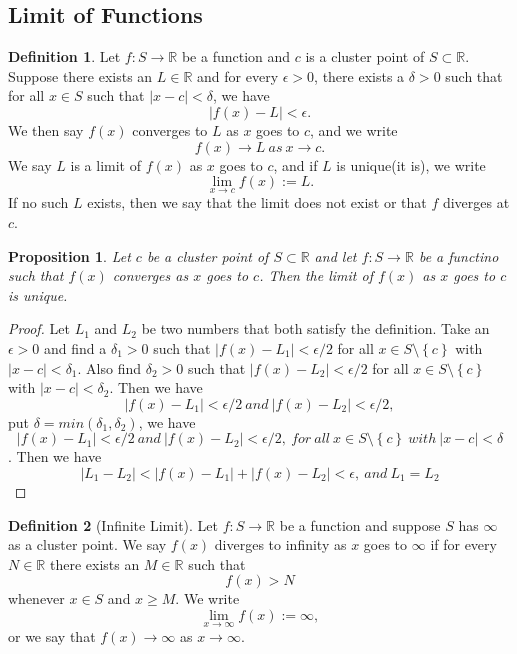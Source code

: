 \documentclass{article}
\newtheorem{prop}[theorem]{Proposition}
\theoremstyle{definition}
\newtheorem{defi}{Definition}[section]
\begin{document}
\subsection{Limit of Functions}
\begin{defi}
Let $f:S\rightarrow \mathbb{R}$ be a function and $c$ is a cluster point of $S\subset \mathbb{R}$. Suppose there exists an $L\in\mathbb{R}$ and for 
every $\epsilon>0$, there exists a $\delta>0$ such that for all $x\in S$ such that $|x-c|<\delta$, we have $$|f(x)-L|<\epsilon.$$
We then say $f(x)$ converges to $L$ as $x$ goes to $c$, and we write $$f(x)\rightarrow L\ as\ x\to c.$$
We say $L$ is a limit of $f(x)$ as $x$ goes to $c$, and if $L$ is unique(it is), we write $$\lim_{x\to c}f(x):=L.$$
If no such $L$ exists, then we say that the limit does not exist or that $f$ diverges at $c$.
\end{defi}

\begin{prop}
    Let $c$ be a cluster point of $S\subset \mathbb{R}$ and let $f:S\to \mathbb{R}$ be a functino such that $f(x)$ converges as $x$ goes to $c$. Then the limit of $f(x)$ as $x$ goes to $c$ is unique.
\end{prop}

\begin{proof}
Let $L_{1}$ and $L_{2}$ be two numbers that both satisfy the definition. Take an $\epsilon>0$ and find a $\delta_{1}>0$ such that $|f(x)-L_{1}|<\epsilon /2$ for all $x\in S\setminus \left\{c\right\}$ with $|x-c|<\delta_{1}$. Also find $\delta_{2}>0$ such that $|f(x)-L_{2}|<\epsilon /2$ for all
$x\in S\setminus \left\{c\right\}$ with $|x-c|<\delta_{2}$. Then we have $$|f(x)-L_{1}|<\epsilon /2\ and\ |f(x)-L_{2}|<\epsilon /2,$$
put $\delta = min(\delta_{1},\delta_{2})$, we have $$|f(x)-L_{1}|<\epsilon /2\ and\ |f(x)-L_{2}|<\epsilon /2,\ for\ all\ x\in S\setminus \left\{c\right\}\ with\ |x-c|<\delta$$.
Then we have 
$$|L_{1}-L_{2}|<|f(x)-L_{1}|+|f(x)-L_{2}|<\epsilon,\ and\ L_{1}=L_{2}$$
\end{proof}

\begin{defi}[Infinite Limit]
    Let \( f: S \rightarrow \mathbb{R} \) be a function and suppose \( S \) has \( \infty \) as a cluster point. We say \( f(x) \) diverges to infinity as \( x \) goes to \( \infty \) if for every \( N \in \mathbb{R} \) there exists an \( M \in \mathbb{R} \) such that
    \[
    f(x) > N
    \]
    whenever \( x \in S \) and \( x \geq M \). We write
    \[
    \lim_{x \rightarrow \infty} f(x) := \infty,
    \]
    or we say that \( f(x) \rightarrow \infty \) as \( x \rightarrow \infty \).    
\end{defi}
\end{document}
